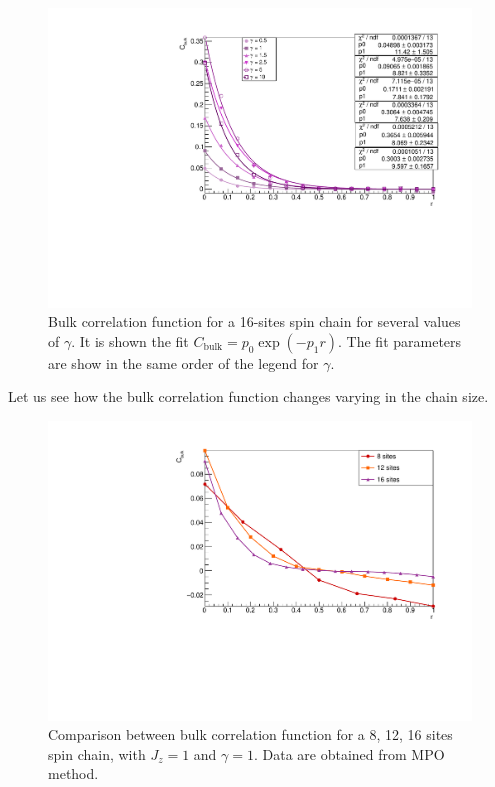\begin{figure}[H]
    \centering
    \includegraphics[scale=0.7]{Figures/16sites/FIT_16sites_CFBulkCONN.pdf}
    \caption{Bulk correlation function for a 16-sites spin chain for several values of $\gamma$. It is shown the fit $C_{\text{bulk}} = p_0 \exp{(-p_1 r)}$. The fit parameters are show in the same order of the legend for $\gamma$.}
    \label{fig:FIT_16sites_CFBulkCONN}
\end{figure}

Let us see how the bulk correlation function changes varying in the chain size.

\begin{figure}[H]
    \centering
    \includegraphics[scale=0.7]{Figures/CBulkwConnTermVSsize_J1051.pdf}
    \caption{Comparison between bulk correlation function for a 8, 12, 16 sites spin chain, with $J_z = 1$ and $\gamma = 1$. Data are obtained from MPO method.}
    \label{fig:CBulkwConnTermVSsize_J1051}
\end{figure}

